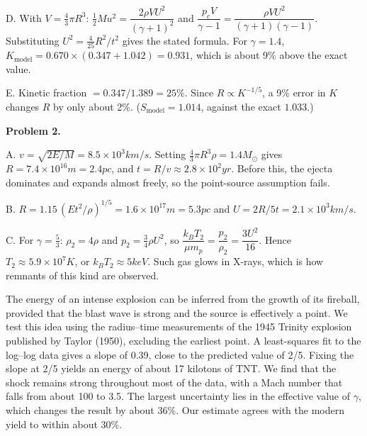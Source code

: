 \documentclass[11pt,a4paper]{article}
\begin{document}
D. With $V=\frac43\pi R^3$: $\frac12Mu^2=\dfrac{2\rho VU^2}{(\gamma+1)^2}$ and $\dfrac{p_cV}{\gamma-1}=\dfrac{\rho VU^2}{(\gamma+1)(\gamma-1)}$. Substituting $U^2=\frac{4}{25}R^2/t^2$ gives the stated formula. For $\gamma=1.4$, $K_{\text{model}}=0.670\times(0.347+1.042)=0.931$, which is about 9\% above the exact value.

E. Kinetic fraction $=0.347/1.389=25\%$. Since $R\propto K^{-1/5}$, a 9\% error in $K$ changes $R$ by only about 2\%. ($S_{\text{model}}=1.014$, against the exact $1.033$.)

\textbf{Problem 2.}

A. $v=\sqrt{2E/M}=8.5\times10^3\unit{km/s}$. Setting $\frac43\pi R^3\rho=1.4M_\odot$ gives $R=7.4\times10^{16}\unit{m}=2.4\unit{pc}$, and $t=R/v\approx2.8\times10^2\unit{yr}$. Before this, the ejecta dominates and expands almost freely, so the point-source assumption fails.

B. $R=1.15\,(Et^2/\rho)^{1/5}=1.6\times10^{17}\unit{m}=5.3\unit{pc}$ and $U=2R/5t=2.1\times10^3\unit{km/s}$.

C. For $\gamma=\frac53$: $\rho_2=4\rho$ and $p_2=\frac34\rho U^2$, so $\dfrac{k_BT_2}{\mu m_p}=\dfrac{p_2}{\rho_2}=\dfrac{3U^2}{16}$. Hence $T_2\approx5.9\times10^7\unit{K}$, or $k_BT_2\approx5\unit{keV}$. Such gas glows in X-rays, which is how remnants of this kind are observed.

\begin{tipbox}\small
The energy of an intense explosion can be inferred from the growth of its fireball, provided that the blast wave is strong and the source is effectively a point. We test this idea using the radius--time measurements of the 1945 Trinity explosion published by Taylor (1950), excluding the earliest point. A least-squares fit to the log--log data gives a slope of 0.39, close to the predicted value of 2/5. Fixing the slope at 2/5 yields an energy of about 17 kilotons of TNT. We find that the shock remains strong throughout most of the data, with a Mach number that falls from about 100 to 3.5. The largest uncertainty lies in the effective value of $\gamma$, which changes the result by about 36\%. Our estimate agrees with the modern yield to within about 30\%.
\end{tipbox}
\end{document}
